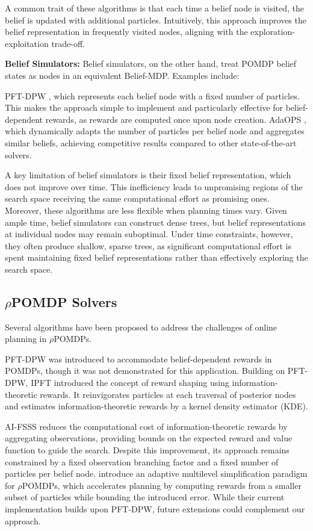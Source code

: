 		A common trait of these algorithms is that each time a belief node is visited, the belief is updated with additional particles. 
		Intuitively, this approach improves the belief representation in frequently visited nodes, aligning with the exploration-exploitation trade-off.

		\textbf{Belief Simulators:}  
		Belief simulators, on the other hand, treat POMDP belief states as nodes in an equivalent Belief-MDP. Examples include:  

		PFT-DPW \cite{Sunberg18icaps}, which represents each belief node with a fixed number of particles. This makes the approach simple to implement and particularly effective for belief-dependent rewards, as rewards are computed once upon node creation.  
		AdaOPS \cite{Wu21nips}, which dynamically adapts the number of particles per belief node and aggregates similar beliefs, achieving competitive results compared to other state-of-the-art solvers.

		A key limitation of belief simulators is their fixed belief representation, which does not improve over time. This inefficiency leads to unpromising regions of the search space receiving the same computational effort as promising ones. 
		Moreover, these algorithms are less flexible when planning times vary.  Given ample time, belief simulators can construct dense trees, but belief representations at individual nodes may remain suboptimal. 
		Under time constraints, however, they often produce shallow, sparse trees, as significant computational effort is spent maintaining fixed belief representations rather than effectively exploring the search space.
				
\subsection{$\rho$POMDP Solvers}

	Several algorithms have been proposed to address the challenges of online planning in $\rho$POMDPs.

	PFT-DPW \cite{Sunberg18icaps} was introduced to accommodate belief-dependent rewards in POMDPs, though it was not demonstrated for this application. 
	Building on PFT-DPW, IPFT \cite{Fischer20icml} introduced the concept of reward shaping using information-theoretic rewards. It reinvigorates particles at each traversal of posterior nodes and estimates information-theoretic rewards by a kernel density estimator (KDE).
	
	AI-FSSS \cite{Barenboim22ijcai} reduces the computational cost of information-theoretic rewards by aggregating observations, providing bounds on the expected reward and value function to guide the search. Despite this improvement, its approach remains constrained by a fixed observation branching factor and a fixed number of particles per belief node. 
	\cite{Zhitnikov24ijrr} introduce an adaptive multilevel simplification paradigm for $\rho$POMDPs, which accelerates planning by computing rewards from a smaller subset of particles while bounding the introduced error. While their current implementation builds upon PFT-DPW, future extensions could complement our approach.
	
